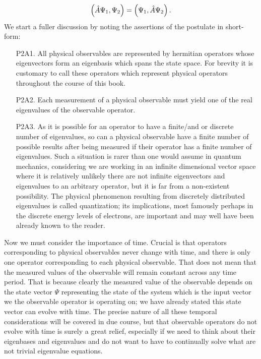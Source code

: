 $$
\left(\hat{A}\Psi_{1},\Psi_{2}\right)=\left(\Psi_{1},\hat{A}\Psi_{2}\right).
$$
We start a fuller discussion by noting the assertions of the postulate in short-form:
\begin{enumerate}
    \item[P2A1.] All physical observables are represented by hermitian operators whose eigenvectors form an eigenbasis which spans the state space. For brevity it is customary to call these operators which represent physical operators  throughout the course of this book.
    \item[P2A2.] Each measurement of a physical observable must yield one of the real eigenvalues of the observable operator.
    \item[P2A3.] As it is possible for an operator to have a finite/and or discrete number of eigenvalues, so can a physical observable have a finite number of possible results after being measured if their operator has a finite number of eigenvalues. Such a situation is rarer than one would assume in quantum mechanics, considering we are working in an infinite dimensional vector space where it is relatively unlikely there are not infinite eigenvectors and eigenvalues to an arbitrary operator, but it is far from a non-existent possibility. The physical phenomenon resulting from discretely distributed eigenvalues is called quantization; its implications, most famously perhaps in the discrete energy levels of electrons, are important and may well have been already known to the reader.
\end{enumerate}
Now we must consider the importance of time. Crucial is that operators corresponding to physical observables never change with time, and there is only one operator corresponding to each physical observable.  That does not mean that the measured values of the observable will remain constant across any time period. That is because clearly the measured value of the observable depends on the state vector $\Psi$ representing the state of the system which is the input vector we the observable operator is operating on; we have already stated this state vector can evolve with time. The precise nature of all these temporal considerations will be covered in due course, but that observable operators do not evolve with time is surely a great relief, especially if we need to think about their eigenbases and eigenvalues and do not want to have to continually solve what are not trivial eigenvalue equations.
\\\\
